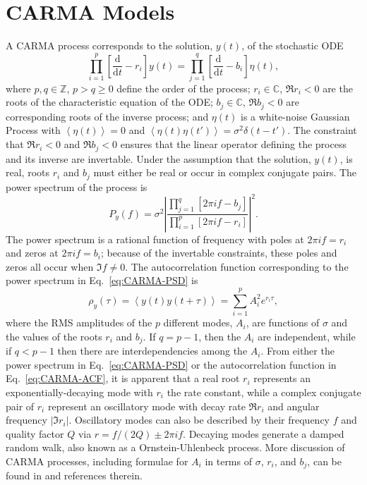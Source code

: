 \documentclass[modern]{aastex61}
\newcommand{\dd}{\mathrm{d}}
\newcommand{\diff}[2]{\frac{\dd #1}{\dd #2}}
\begin{document}
\appendix

\section{CARMA Models}
\label{carmatheory}

A CARMA process corresponds to the solution, $y(t)$, of the stochastic ODE
%
\begin{equation}
  \label{eq:GP-definition}
  \prod_{i=1}^{p} \left[ \diff{}{t} - r_i \right] y(t) =
  \prod_{j = 1}^{q} \left[ \diff{}{t} - b_i \right] \eta(t),
\end{equation}
%
where $p, q \in \mathbb{Z}$, $p > q \geq 0$ define the order of the process;
$r_i \in \mathbb{C}$, $\Re r_i < 0$ are the roots of the characteristic equation
of the ODE; $b_j \in \mathbb{C}$, $\Re b_j < 0$ are corresponding roots of the
inverse process; and $\eta(t)$ is a white-noise Gaussian Process with
$\left\langle \eta(t) \right\rangle = 0$ and $\left\langle \eta(t) \eta(t')
\right\rangle = \sigma^2 \delta\left(t - t' \right)$.  The constraint that $\Re
r_i < 0$ and $\Re b_j < 0$ ensures that the linear operator defining the process
and its inverse are invertable.  Under the assumption that the solution, $y(t)$,
is real, roots $r_i$ and $b_j$ must either be real or occur in complex conjugate
pairs.  The power spectrum of the process is
%
\begin{equation}
  \label{eq:CARMA-PSD}
  P_y(f) = \sigma^2 \left| \frac{\prod_{j=1}^q \left[ 2 \pi i f - b_j \right]}{\prod_{i=1}^p \left[ 2 \pi i f - r_i \right]} \right|^2.
\end{equation}
%
The power spectrum is a rational function of frequency with poles at $2\pi i f =
r_i$ and zeros at $2\pi i f = b_i$; because of the invertable constraints, these
poles and zeros all occur when $\Im f \neq 0$.  The autocorrelation function
corresponding to the power spectrum in Eq.\ \eqref{eq:CARMA-PSD} is
%
\begin{equation}
  \label{eq:CARMA-ACF}
  \rho_y (\tau) = \left\langle y\left( t \right) y \left( t + \tau \right) \right\rangle = \sum_{i=1}^p A_i^2 e^{r_i \tau},
\end{equation}
%
where the RMS amplitudes of the $p$ different modes, $A_i$, are functions of
$\sigma$ and the values of the roots $r_i$ and $b_j$.  If $q = p-1$, then the
$A_i$ are independent, while if $q < p-1$ then there are interdependencies among
the $A_i$.  From either the power spectrum in Eq.\ \eqref{eq:CARMA-PSD} or the
autocorrelation function in Eq.\ \eqref{eq:CARMA-ACF}, it is apparent that a
real root $r_i$ represents an exponentially-decaying mode with $r_i$ the rate
constant, while a complex conjugate pair of $r_i$ represent an oscillatory mode
with decay rate $\Re r_i$ and angular frequency $\left|\Im r_i\right|$.
Oscillatory modes can also be described by their frequency $f$ and quality
factor $Q$ via $r = f/(2Q) \pm 2\pi i f$.  Decaying modes generate a damped
random walk, also known as a Ornstein-Uhlenbeck process.  More discussion of CARMA processes, including formulae for $A_i$ in terms of $\sigma$, $r_i$, and $b_j$, can be found in \citet{Kelly2014} and references therein.
\end{document}
